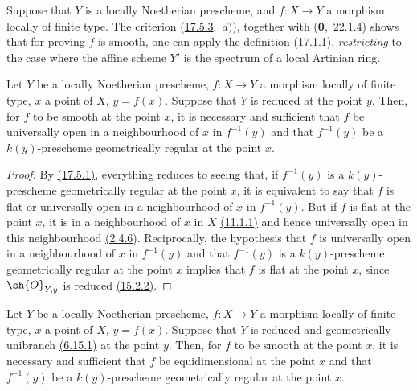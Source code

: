 \begin{remark}[17.5.4]
\label{IV.17.5.4}
Suppose that $Y$ is a locally Noetherian prescheme, and $f:X\to Y$ a morphism locally of finite type.
The criterion ({\hyperlink{ega4.c04.prop.17-5-3}{17.5.3}},~$d)$), together with ($\mathbf{0}$,~22.1.4) shows that for proving $f$ is smooth, one can apply the definition {\hyperlink{ega4.c04.def.17-1-1}{(17.1.1)}}, \emph{restricting} to the case where the affine scheme $Y'$ is the spectrum of a local Artinian ring.
\end{remark}

\begin{proposition}[17.5.5]
\label{IV.17.5.5}
Let $Y$ be a locally Noetherian prescheme, $f:X\to Y$ a morphism locally of finite type, $x$ a point of $X$, $y=f(x)$.
Suppose that $Y$ is reduced at the point $y$.
Then, for $f$ to be smooth at the point $x$, it is necessary and sufficient that $f$ be universally open in a neighbourhood of $x$ in $f^{-1}(y)$ and that $f^{-1}(y)$ be a $k(y)$-prescheme geometrically regular at the point $x$.
\end{proposition}

\begin{proof}
By {\hyperlink{ega4.c04.thm.17-5-1}{(17.5.1)}}, everything reduces to seeing that, if $f^{-1}(y)$ is a $k(y)$-prescheme geometrically regular at the point $x$, it is equivalent to say that $f$ is flat or universally open in a neighbourhood of $x$ in $f^{-1}(y)$.
But if $f$ is flat at the point $x$, it is in a neighbourhood of $x$ in $X$ {\hyperlink{ega4.c04.thm.11-1-1}{(11.1.1)}} and hence universally open in this neighbourhood {\hyperlink{ega4.c04.thm.2-4-6}{(2.4.6)}}.
Reciprocally, the hypothesis that $f$ is universally open in a neighbourhood of $x$ in $f^{-1}(y)$ and that $f^{-1}(y)$ is a $k(y)$-prescheme geometrically regular at the point $x$ implies that $f$ is flat at the point $x$, since $\sh{O}_{Y,y}$ is reduced {\hyperlink{ega4.c04.thm.15-2-2}{(15.2.2)}}.
\end{proof}

\begin{corollary}[17.5.6]
\label{IV.17.5.6}
Let $Y$ be a locally Noetherian prescheme, $f:X\to Y$ a morphism locally of finite type, $x$ a point of $X$, $y=f(x)$.
Suppose that $Y$ is reduced and geometrically unibranch {\hyperlink{ega4.c04.statement.6-15-1}{(6.15.1)}} at the point $y$.
Then, for $f$ to be smooth at the point $x$, it is necessary and sufficient that $f$ be equidimensional at the point $x$ and that $f^{-1}(y)$ be a $k(y)$-prescheme geometrically regular at the point $x$.
\end{corollary}

